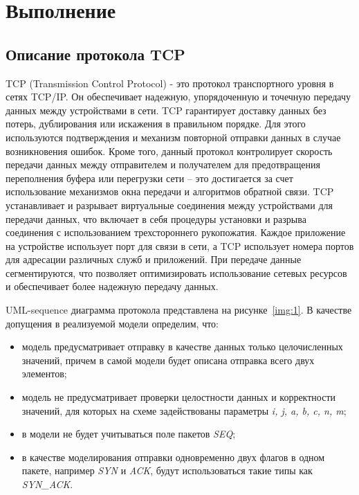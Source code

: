 \section{Выполнение}

\subsection{Описание протокола TCP}

TCP (Transmission Control Protocol) - это протокол транспортного уровня в сетях TCP/IP. Он обеспечивает надежную, упорядоченную и точечную передачу данных между устройствами в сети.
TCP гарантирует доставку данных без потерь, дублирования или искажения в правильном порядке. 
Для этого используются подтверждения и механизм повторной отправки данных в случае возникновения ошибок.
Кроме того, данный протокол контролирует скорость передачи данных между отправителем и получателем для предотвращения переполнения буфера или перегрузки сети -- это достигается за счет использование механизмов окна передачи и алгоритмов обратной связи.
TCP устанавливает и разрывает виртуальные соединения между устройствами для передачи данных, что включает в себя процедуры установки и разрыва соединения с использованием трехстороннего рукопожатия.
Каждое приложение на устройстве использует порт для связи в сети, а TCP использует номера портов для адресации различных служб и приложений.
При передаче данные сегментируются, что позволяет оптимизировать использование сетевых ресурсов и обеспечивает более надежную передачу данных.

UML-sequence диаграмма протокола представлена на рисунке~\ref{img:1}. В качестве допущения в реализуемой модели определим, что:

\begin{itemize}
	\item модель предусматривает отправку в качестве данных только целочисленных значений, причем в самой модели будет описана отправка всего двух элементов;
	\item модель не предусматривает проверки целостности данных и корректности значений, для которых на схеме задействованы параметры \textit{i, j, a, b, c, n, m};
	\item в модели не будет учитываться поле пакетов \textit{SEQ};
	\item в качестве моделирования отправки одновременно двух флагов в одном пакете, например \textit{SYN} и \textit{ACK}, будут использоваться такие типы как \textit{SYN\_ACK}.
\end{itemize}

